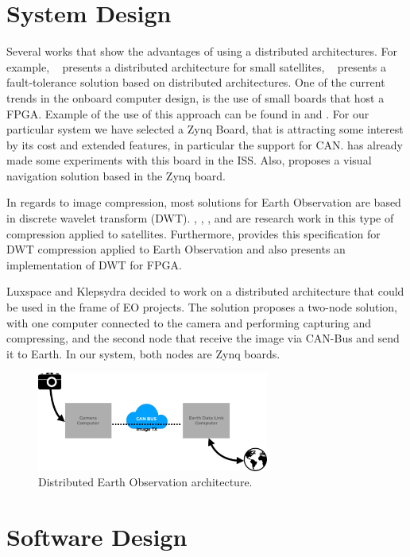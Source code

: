 \documentclass[a4paper,twocolumn]{esapub2005} %
\begin{document}
\section{System Design}

Several works that show the advantages of using a distributed architectures. For example, ~\cite{DIST_COMP1} presents a distributed architecture for small satellites, ~\cite{DIST_COMP2} presents a fault-tolerance solution based on distributed architectures.  One of the current trends in the onboard computer design, is the use of small boards that host a FPGA. Example of the use of this approach can be found in \cite{FPGA1} and \cite{FPGA2}. For our particular system we have selected a Zynq Board, that is attracting some interest by its cost and extended features, in particular the support for CAN. \cite{NASA_ZYNQ} has already made some experiments with this board in the ISS. Also, \cite{VIS_NAV1} proposes a visual navigation solution based in the Zynq board. 

In regards to image compression, most solutions for Earth Observation are based in discrete wavelet transform (DWT). \cite{DWT1}, \cite{DWT2}, \cite{DWT3}, and \cite{DWT4} are research work in this type of compression applied to satellites. Furthermore, \cite{ESA_DWT} provides this specification for DWT compression applied to Earth Observation and also \cite{ESA_FPGA} presents an implementation of DWT for FPGA. 

Luxspace and Klepsydra decided to work on a distributed architecture that could be used in the frame of EO projects. The solution proposes a two-node solution, with one computer connected to the camera and performing capturing and compressing, and the second node that receive the image via CAN-Bus and send it to Earth. In our system, both nodes are Zynq boards.

\begin{figure}[!h]
\centering
\includegraphics[width = 3in]{images/distributed_architecture}
\caption{Distributed Earth Observation architecture.\label{fig:distributed_architecture}}
\end{figure}

\section{Software Design}
\end{document}
